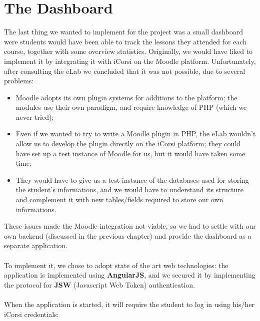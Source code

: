 \section{The Dashboard}

The last thing we wanted to implement for the project was a small dashboard were students would have been able to track the lessons they attended for each course, together with some overview statistics. Originally, we would have liked to implement it by integrating it with iCorsi on the Moodle platform. Unfortunately, after consulting the eLab we concluded that it was not possible, due to several problems:

\begin{itemize}
	\item Moodle adopts its own plugin systems for additions to the platform; the modules use their own paradigm, and require knowledge of PHP (which we never tried);
	\item Even if we wanted to try to write a Moodle plugin in PHP, the eLab wouldn't allow us to develop the plugin directly on the iCorsi platform; they could have set up a test instance of Moodle for us, but it would have taken some time; 	\item They would have to give us a test instance of the databases used for storing the student's informations, and we would have to understand its structure and complement it with new tables/fields required to store our own informations.
\end{itemize}

These issues made the Moodle integration not viable, so we had to settle with our own backend (discussed in the previous chapter) and provide the dashboard as a separate application.

\paragraph{}
To implement it, we chose to adopt state of the art web technologies: the application is implemented using \textbf{AngularJS}, and we secured it by implementing the protocol for \textbf{JSW} (Javascript Web Token) authentication.

\paragraph{}
When the application is started, it will require the student to log in using his/her iCorsi credentials:

